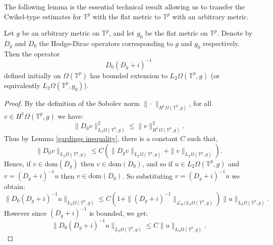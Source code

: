     The following lemma is the essential technical result allowing us to transfer the Cwikel-type estimates for $\mathbb{T}^p$ with the flat metric
    to $\mathbb{T}^p$ with an arbitrary metric.
    \begin{lem}\label{main transition lemma} 
        Let $g$ be an arbitrary metric on $\mathbb{T}^p$, and let $g_0$ be the flat metric on $\mathbb{T}^p$. Denote by $D_g$ and $D_0$ the Hodge-Dirac
        operators corresponding to $g$ and $g_0$ respectively. Then the operator
        \begin{equation*}
            D_0(D_g+i)^{-1}
        \end{equation*}
        defined initially on $\Omega(\mathbb{T}^p)$ has bounded extension to $L_2\Omega(\mathbb{T}^p,g)$ (or equivalently $L_2\Omega(\mathbb{T}^p,g_0)$).
    \end{lem}
    \begin{proof} 
        By the definition of the Sobolev norm $\|\cdot \|_{H^1\Omega(\mathbb{T}^p,g)}$, for all $v \in H^1\Omega(\mathbb{T}^p,g)$ we have:
        \begin{equation*}
            \|D_0v\|_{L_2\Omega(\mathbb{T}^p,g)}^2 \leq \|v\|_{H^1\Omega(\mathbb{T}^p,g)}^2.
        \end{equation*}
        Thus by Lemma \ref{gardings inequality}, there is a constant $C$ such that,
        \begin{equation*}
            \|D_0v\|_{L_2\Omega(\mathbb{T}^p,g)} \leq C(\|D_gv\|_{L_2\Omega(\mathbb{T}^p,g)}+\|v\|_{L_2\Omega(\mathbb{T}^p,g)}).
        \end{equation*}
        Hence, if $v \in \mathrm{dom}(D_g)$ then $v \in \mathrm{dom}(D_0)$, and so if $u \in L_2\Omega(\mathbb{T}^p,g)$ and $v = (D_g+i)^{-1}u$ then $v \in \mathrm{dom}(D_0)$. 
        So substituting $v = (D_g+i)^{-1}u$ we obtain:
        \begin{equation*}
            \|D_0(D_g+i)^{-1}u\|_{L_2\Omega(\mathbb{T}^p,g)} \leq C(1+\|(D_g+i)^{-1}\|_{\mathcal{L}_{\infty}(L_2\Omega(\mathbb{T}^p,g)})\|u\|_{L_2\Omega(\mathbb{T}^p,g)}.
        \end{equation*}
        However since $(D_g+i)^{-1}$ is bounded, we get:
        \begin{equation*}
            \|D_0(D_g+i)^{-1}u\|_{L_2\Omega(\mathbb{T}^p,g)} \leq C\|u\|_{L_2\Omega(\mathbb{T}^p,g)}.
        \end{equation*}
    \end{proof}
    
